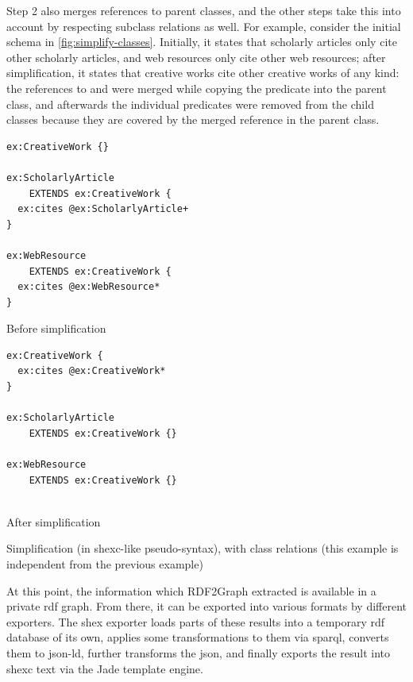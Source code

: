 Step 2 also merges references to parent classes,
and the other steps take this into account by respecting subclass relations as well.
For example, consider the initial \gls{schema} in \cref{fig:simplify-classes}.
Initially, it states that scholarly articles only cite other scholarly articles,
and web resources only cite other web resources;
after simplification, it states that creative works cite other creative works of any kind:
the references to  and 
were merged while copying the  predicate into the  parent class,
and afterwards the individual \glspl{predicate} were removed from the child classes
because they are covered by the merged reference in the parent class.

\begin{lstfloat}[ht]
\begin{sublstfloat}[t]{0.45\textwidth}
\begin{lstlisting}
ex:CreativeWork {}

ex:ScholarlyArticle
    EXTENDS ex:CreativeWork {
  ex:cites @ex:ScholarlyArticle+
}

ex:WebResource
    EXTENDS ex:CreativeWork {
  ex:cites @ex:WebResource*
}
\end{lstlisting}
\caption{Before simplification}
\label{fig:simplify-classes-before}
\end{sublstfloat}
\begin{sublstfloat}[t]{0.45\textwidth}
\begin{lstlisting}[showlines=true]
ex:CreativeWork {
  ex:cites @ex:CreativeWork*
}

ex:ScholarlyArticle
    EXTENDS ex:CreativeWork {}

ex:WebResource
    EXTENDS ex:CreativeWork {}


\end{lstlisting}
\caption{After simplification}
\label{fig:simplify-classes-after}
\end{sublstfloat}
\caption[Simplification, with class relations]{
  Simplification (in \gls{shexc}-like pseudo-syntax), with class relations
  (this example is independent from the previous example)
}
\label{fig:simplify-classes}
\end{lstfloat}

At this point, the information which \gls{RDF2Graph} extracted is available in a private \gls{rdf} graph.
From there, it can be exported into various formats by different exporters.
The \gls{shex} exporter loads parts of these results into a temporary \gls{rdf} database of its own,
applies some transformations to them via \gls{sparql},
converts them to \gls{json-ld},
further transforms the \gls{json},
and finally exports the result into \gls{shexc} text via the Jade template engine.

